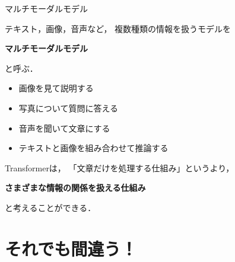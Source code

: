 \documentclass[aspectratio=169,professionalfonts]{beamer}
\begin{document}
\begin{frame}{マルチモーダルモデル}

  テキスト，画像，音声など，
  複数種類の情報を扱うモデルを

  \begin{center}
    \textbf{マルチモーダルモデル}
  \end{center}

  と呼ぶ．

  \vspace{1em}

  \begin{itemize}
    \item 画像を見て説明する
    \item 写真について質問に答える
    \item 音声を聞いて文章にする
    \item テキストと画像を組み合わせて推論する
  \end{itemize}

  \vspace{1em}

  Transformerは，
  「文章だけを処理する仕組み」というより，

  \begin{center}
    \textbf{さまざまな情報の関係を扱える仕組み}
  \end{center}

  と考えることができる．


\end{frame}


\section{それでも間違う！}
\end{document}
